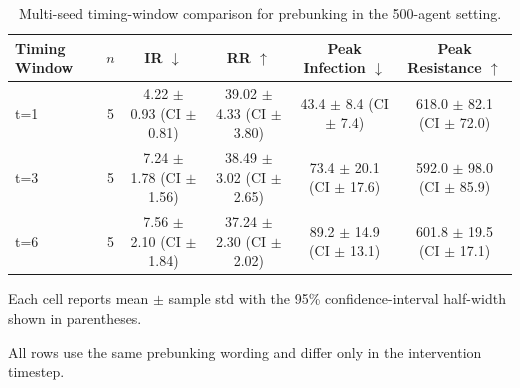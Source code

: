 \begin{table}[t]
\centering
\small
\caption{Multi-seed timing-window comparison for prebunking in the 500-agent setting.}
\label{tab:prebunking_timing_multiseed_results}
\begin{threeparttable}
\begin{tabular}{lccccc}
\toprule
Timing Window & $n$ & IR $\downarrow$ & RR $\uparrow$ & Peak Infection $\downarrow$ & Peak Resistance $\uparrow$ \\
\midrule
t=1 & 5 & 4.22 $\pm$ 0.93 (CI $\pm$ 0.81) & 39.02 $\pm$ 4.33 (CI $\pm$ 3.80) & 43.4 $\pm$ 8.4 (CI $\pm$ 7.4) & 618.0 $\pm$ 82.1 (CI $\pm$ 72.0) \\
t=3 & 5 & 7.24 $\pm$ 1.78 (CI $\pm$ 1.56) & 38.49 $\pm$ 3.02 (CI $\pm$ 2.65) & 73.4 $\pm$ 20.1 (CI $\pm$ 17.6) & 592.0 $\pm$ 98.0 (CI $\pm$ 85.9) \\
t=6 & 5 & 7.56 $\pm$ 2.10 (CI $\pm$ 1.84) & 37.24 $\pm$ 2.30 (CI $\pm$ 2.02) & 89.2 $\pm$ 14.9 (CI $\pm$ 13.1) & 601.8 $\pm$ 19.5 (CI $\pm$ 17.1) \\
\bottomrule
\end{tabular}
\begin{tablenotes}[flushleft]
\footnotesize
\item Each cell reports mean $\pm$ sample std with the 95\% confidence-interval half-width shown in parentheses.
\item All rows use the same prebunking wording and differ only in the intervention timestep.
\end{tablenotes}
\end{threeparttable}
\end{table}
